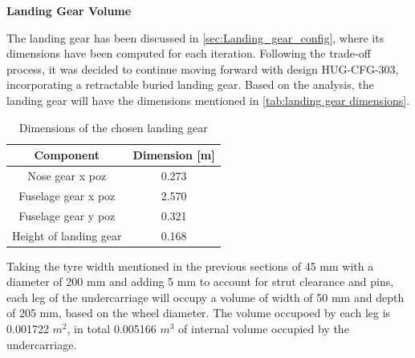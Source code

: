 \textbf{Landing Gear Volume}

The landing gear has been discussed in \autoref{sec:Landing_gear_config}, where its dimensions have been computed for each iteration. Following the trade-off process, it was decided to continue moving forward with design HUG-CFG-303, incorporating a retractable buried landing gear. Based on the analysis, the landing gear will have the dimensions mentioned in \autoref{tab:landing gear dimensions}. 
\begin{table}[H]
    \centering
 
    \begin{tabular}{|c|c|}
    \hline
        \textbf{Component} & \textbf{Dimension [m]}  \\
        \hline \hline
         Nose gear x poz & 0.273 \\\hline 
         Fuselage gear x poz & 2.570 \\\hline
         Fuselage gear y poz & 0.321 \\\hline 
         Height of landing gear & 0.168\\ \hline
         
    \end{tabular}
    \caption{Dimensions of the chosen landing gear}
    \label{tab:landing gear dimensions}
\end{table}

Taking the tyre width mentioned in the previous sections of 45 mm with a diameter of 200 mm and adding 5 mm to account for strut clearance and pins, each leg of the undercarriage will occupy a volume of width of 50 mm and depth of 205 mm, based on the wheel diameter. The volume occupoed by each leg is 0.001722 $m^2$, in total 0.005166 $m^3$ of internal volume occupied by the undercarriage.
